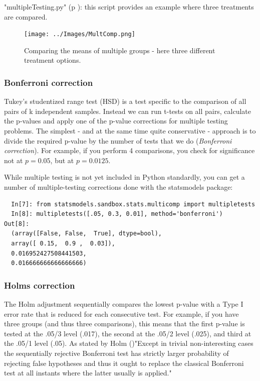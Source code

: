 \PyImg "multipleTesting.py" (p \pageref{py:multipleTesting}): this script provides an example where three treatments are compared.

\begin{figure}
  \centering
  \texttt{[image: ../Images/MultComp.png]}\\
  \caption{Comparing the means of multiple groups - here three different treatment options.}
\end{figure}

\subsubsection{Bonferroni correction}

Tukey's studentized range test (HSD) is a test specific to the comparison of all pairs of k independent samples. Instead we can run t-tests on all pairs, calculate the p-values and apply one of the p-value corrections for multiple testing problems. The simplest - and at the same time quite conservative - approach is to divide the required p-value by the number of tests that we do (\emph{Bonferroni correction}). For example, if you perform 4 comparisons, you check for significance not at $p=0.05$, but at $p=0.0125$.

While multiple testing is not yet included in Python standardly, you can get a number of multiple-testing corrections done with the statsmodels package:

\begin{lstlisting}
  In[7]: from statsmodels.sandbox.stats.multicomp import multipletests
  In[8]: multipletests([.05, 0.3, 0.01], method='bonferroni')
Out[8]:
  (array([False, False,  True], dtype=bool),
  array([ 0.15,  0.9 ,  0.03]),
  0.016952427508441503,
  0.016666666666666666)
\end{lstlisting}

\subsubsection{Holms correction}

The Holm adjustment sequentially compares the lowest p-value with a Type I error rate that is reduced for each consecutive test. For example, if you have three groups (and thus three comparisons), this means that the first p-value is tested at the .05/3 level (.017), the second at the .05/2 level (.025), and third at the .05/1 level (.05).
As stated by Holm (\cite{Holm1979})"Except in trivial non-interesting cases the sequentially rejective Bonferroni test has strictly larger probability of rejecting false hypotheses and thus it ought to replace the classical Bonferroni test at all instants where the latter usually is applied."


